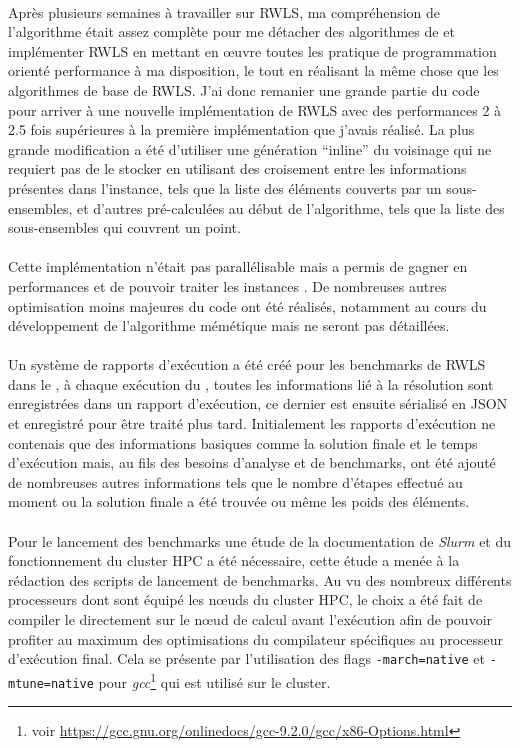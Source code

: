 \documentclass[a4paper,11pt,twoside,french,report]{../common/simplem}
\begin{document}
				\paragraph*{}
					Après plusieurs semaines à travailler sur \gls{RWLS}, ma compréhension de l'algorithme était assez complète pour me détacher des algorithmes de \cite{Gao2015} et implémenter \gls{RWLS} en mettant en œuvre toutes les pratique de programmation orienté performance à ma disposition, le tout en réalisant la même chose que les algorithmes de base de \gls{RWLS}. J'ai donc remanier une grande partie du code pour arriver à une nouvelle implémentation de \gls{RWLS} avec des performances 2 à 2.5 fois supérieures à la première implémentation que j'avais réalisé. La plus grande modification a été d'utiliser une génération ``inline'' du voisinage qui ne requiert pas de le stocker en utilisant des croisement entre les informations présentes dans l'instance, tels que la liste des éléments couverts par un sous-ensembles, et d'autres pré-calculées au début de l'algorithme, tels que la liste des sous-ensembles qui couvrent un point.
				\paragraph*{}
					Cette implémentation n'était pas parallélisable mais a permis de gagner en performances et de pouvoir traiter les instances . De nombreuses autres optimisation moins majeures du code ont été réalisés, notamment au cours du développement de l'algorithme mémétique mais ne seront pas détaillées.
				\paragraph*{}
					Un système de rapports d'exécution a été créé pour les benchmarks de \gls{RWLS} dans le \solver{}, à chaque exécution du \solver{}, toutes les informations lié à la résolution sont enregistrées dans un rapport d'exécution, ce dernier est ensuite sérialisé en JSON et enregistré pour être traité plus tard. Initialement les rapports d'exécution ne contenais que des informations basiques comme la solution finale et le temps d'exécution mais, au fils des besoins d'analyse et de benchmarks, ont été ajouté de nombreuses autres informations tels que le nombre d'étapes effectué au moment ou la solution finale a été trouvée ou même les poids des éléments.
				\paragraph*{}
					Pour le lancement des benchmarks une étude de la documentation de \textit{Slurm} et du fonctionnement du cluster \gls{HPC} a été nécessaire, cette étude a menée à la rédaction des scripts de lancement de benchmarks. Au vu des nombreux différents processeurs dont sont équipé les nœuds du cluster \gls{HPC}, le choix a été fait de compiler le \solver{} directement sur le nœud de calcul avant l'exécution afin de pouvoir profiter au maximum des optimisations du compilateur spécifiques au processeur d'exécution final. Cela se présente par l'utilisation des flags \texttt{-march=native} et \texttt{-mtune=native} pour \textit{gcc}\footnote{voir \url{https://gcc.gnu.org/onlinedocs/gcc-9.2.0/gcc/x86-Options.html}} qui est utilisé sur le cluster.
\end{document}
